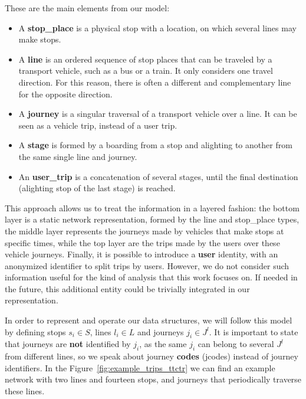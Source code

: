     These are the main elements from our model:
    \begin{itemize}
        \item A \textbf{stop\_place} is a physical stop with a location, on which several lines may make stops.
        \item A \textbf{line} is an ordered sequence of stop places that can be traveled by a transport vehicle, such as a bus or a train. It only considers one travel direction. For this reason, there is often a different and complementary line for the opposite direction.%
        \item A \textbf{journey} is a singular traversal of a transport vehicle over a line. It can be seen as a vehicle trip, instead of a user trip.
        \item A \textbf{stage} is formed by a boarding from a stop and alighting to another from the same single line and journey.
        \item An \textbf{user\_trip} is a concatenation of several stages, until the final destination (alighting stop of the last stage) is reached.
    \end{itemize}
	
	This approach allows us to treat the information in a layered fashion: the bottom layer is a static network representation, formed by the line and stop\_place types, the middle layer represents the journeys made by vehicles that make stops at specific times, while the top layer are the trips made by the users over these vehicle journeys. Finally, it is possible to introduce a \textbf{user} identity, with an anonymized identifier to split trips by users. However, we do not consider such information useful for the kind of analysis that this work focuses on. If needed in the future, this additional entity could be trivially integrated in our representation.
	
	In order to represent and operate our data structures, we will follow this model by defining stops $s_i \in S$, lines $l_i \in L$ and journeys $j_i \in J^l$. It is important to state that journeys are \textbf{not} identified by $j_i$, as the same $j_i$ can belong to several $J^l$ from different lines, so we speak about journey \textbf{codes} (jcodes) instead of journey identifiers. In the Figure~\ref{fig:example_trips_ttctr} we can find an example network with two lines and fourteen stops, and journeys that periodically traverse these lines.
	
